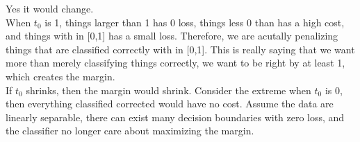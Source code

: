 \documentclass[paper=a4, fontsize=11pt]{scrartcl} %
\numberwithin{equation}{section} %
\numberwithin{figure}{section} %
\numberwithin{table}{section} %
\begin{document}
Yes it would change. \\

When $t_0$ is 1, things larger than 1 has 0 loss, things less 0 than has a high cost, and things with in [0,1] has a small loss. Therefore, we are acutally penalizing things that are classified correctly with in [0,1]. This is really saying that we want more than merely classifying things correctly, we want to be right by at least 1, which creates the margin. \\


If $t_0$ shrinks, then the margin would shrink. Consider the extreme when $t_0$ is 0, then everything classified corrected would have no cost. Assume the data are linearly separable, there can exist many decision boundaries with zero loss, and the classifier no longer care about maximizing the margin. 
\end{document}
